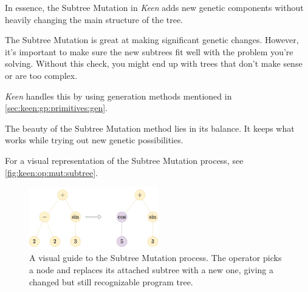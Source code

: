     In essence, the Subtree Mutation in \textit{Keen} adds new genetic components without heavily changing the main 
    structure of the tree.

    \begin{remark}
        The Subtree Mutation is great at making significant genetic changes. However, it's important to make sure the 
        new subtrees fit well with the problem you're solving. Without this check, you might end up with trees that 
        don't make sense or are too complex.

        \textit{Keen} handles this by using generation methods mentioned in \vref{sec:keen:gp:primitives:gen}.
    \end{remark}

    The beauty of the Subtree Mutation method lies in its balance. It keeps what works while trying out new genetic 
    possibilities.

    For a visual representation of the Subtree Mutation process, see \vref{fig:keen:op:mut:subtree}.

    \begin{figure}[ht!]
        \centering
        \includegraphics[width=0.5\textwidth]{img/keen/STM.png}
        \caption{
            A visual guide to the Subtree Mutation process. The operator picks a node and replaces its attached subtree 
            with a new one, giving a changed but still recognizable program tree.
        }
        \label{fig:keen:op:mut:subtree}
    \end{figure}
